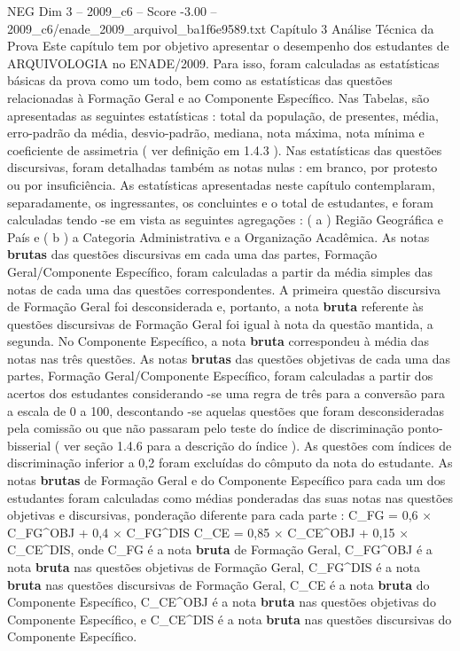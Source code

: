 \begin{textsample}{NEG Dim 3 – 2009\_c6 – Score -3.00 – 2009\_c6/enade\_2009\_arquivol\_ba1f6e9589.txt}  \label{ex:f3_neg_048}
Capítulo 3 Análise Técnica da Prova Este capítulo tem por objetivo apresentar o desempenho dos estudantes de ARQUIVOLOGIA no ENADE/2009.
Para isso, foram calculadas as estatísticas básicas da prova como um todo, bem como as estatísticas das questões relacionadas à Formação Geral e ao Componente Específico.
Nas Tabelas, são apresentadas as seguintes estatísticas : total da população, de presentes, média, erro-padrão da média, desvio-padrão, mediana, nota máxima, nota mínima e coeficiente de assimetria ( ver definição em 1.4.3 ).
Nas estatísticas das questões discursivas, foram detalhadas também as notas nulas : em branco, por protesto ou por insuficiência.
As estatísticas apresentadas neste capítulo contemplaram, separadamente, os ingressantes, os concluintes e o total de estudantes, e foram calculadas tendo -se em vista as seguintes agregações : ( a ) Região Geográfica e País e ( b ) a Categoria Administrativa e a Organização Acadêmica.
As notas \textbf{brutas} das questões discursivas em cada uma das partes, Formação Geral/Componente Específico, foram calculadas a partir da média simples das notas de cada uma das questões correspondentes.
A primeira questão discursiva de Formação Geral foi desconsiderada e, portanto, a nota \textbf{bruta} referente às questões discursivas de Formação Geral foi igual à nota da questão mantida, a segunda.
No Componente Específico, a nota \textbf{bruta} correspondeu à média das notas nas três questões.
As notas \textbf{brutas} das questões objetivas de cada uma das partes, Formação Geral/Componente Específico, foram calculadas a partir dos acertos dos estudantes considerando -se uma regra de três para a conversão para a escala de 0 a 100, descontando -se aquelas questões que foram desconsideradas pela comissão ou que não passaram pelo teste do índice de discriminação ponto-bisserial ( ver seção 1.4.6 para a descrição do índice ).
As questões com índices de discriminação inferior a 0,2 foram excluídas do cômputo da nota do estudante.
As notas \textbf{brutas} de Formação Geral e do Componente Específico para cada um dos estudantes foram calculadas como médias ponderadas das suas notas nas questões objetivas e discursivas, ponderação diferente para cada parte : C\_FG = 0,6 × C\_FG\textasciicircum{}OBJ + 0,4 × C\_FG\textasciicircum{}DIS C\_CE = 0,85 × C\_CE\textasciicircum{}OBJ + 0,15 × C\_CE\textasciicircum{}DIS, onde C\_FG é a nota \textbf{bruta} de Formação Geral, C\_FG\textasciicircum{}OBJ é a nota \textbf{bruta} nas questões objetivas de Formação Geral, C\_FG\textasciicircum{}DIS é a nota \textbf{bruta} nas questões discursivas de Formação Geral, C\_CE é a nota \textbf{bruta} do Componente Específico, C\_CE\textasciicircum{}OBJ é a nota \textbf{bruta} nas questões objetivas do Componente Específico, e C\_CE\textasciicircum{}DIS é a nota \textbf{bruta} nas questões discursivas do Componente Específico.

\end{textsample}
